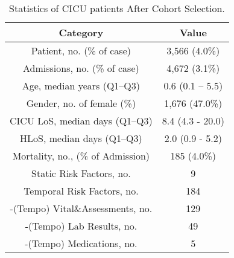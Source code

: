 \begin{table}[ht]
\centering
\caption{Statistics of CICU patients After Cohort Selection.}
\label{tab:data_stat}
\begin{tabular}{c|c}
\toprule
Category & Value\\
\midrule
Patient, no. (\% of case)& 3,566 (4.0\%) \\
Admissions, no. (\% of case) & 4,672 (3.1\%)\\
\hline
Age, median years (Q1--Q3) & 0.6 (0.1 -- 5.5)\\
Gender, no. of female (\%) & 1,676 (47.0\%)\\
CICU LoS, median days (Q1--Q3) & 8.4 (4.3 - 20.0)\\
HLoS, median days (Q1--Q3) & 2.0 (0.9 - 5.2)\\
Mortality, no., (\% of Admission) & 185 (4.0\%)\\
\hline
Static Risk Factors, no.& 9\\
Temporal Risk Factors, no. & 184\\
-(Tempo) Vital\&Assessments, no. & 129\\
-(Tempo) Lab Results, no. & 49\\
-(Tempo) Medications, no. & 5\\
\bottomrule
\end{tabular}
\vspace{-0.35cm}
\end{table}




